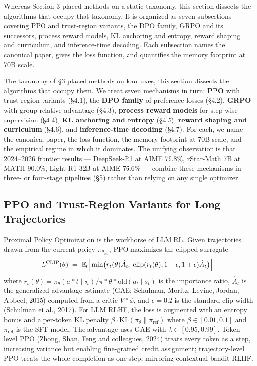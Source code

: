 Whereas Section 3 placed methods on a static taxonomy, this section dissects the algorithms that occupy that taxonomy. It is organized as seven subsections covering PPO and trust-region variants, the DPO family, GRPO and its successors, process reward models, KL anchoring and entropy, reward shaping and curriculum, and inference-time decoding. Each subsection names the canonical paper, gives the loss function, and quantifies the memory footprint at 70B scale.

The taxonomy of §3 placed methods on four axes; this section dissects the algorithms that occupy them. We treat seven mechanisms in turn: \textbf{PPO} with trust-region variants (§4.1), the \textbf{DPO family} of preference losses (§4.2), \textbf{GRPO} with group-relative advantage (§4.3), \textbf{process reward models} for step-wise supervision (§4.4), \textbf{KL anchoring and entropy} (§4.5), \textbf{reward shaping and curriculum} (§4.6), and \textbf{inference-time decoding} (§4.7). For each, we name the canonical paper, the loss function, the memory footprint at 70B scale, and the empirical regime in which it dominates. The unifying observation is that 2024--2026 frontier results --- DeepSeek-R1 at AIME 79.8\%, rStar-Math 7B at MATH 90.0\%, Light-R1 32B at AIME 76.6\% --- combine these mechanisms in three- or four-stage pipelines (§5) rather than relying on any single optimizer.

\subsection{PPO and Trust-Region Variants for Long Trajectories}\label{ppo-and-trust-region-variants-for-long-trajectories}

Proximal Policy Optimization is the workhorse of LLM RL. Given trajectories drawn from the current policy \(\pi_{\theta_{\mathrm{old}}}\), PPO maximizes the clipped surrogate
\[L^{\mathrm{CLIP}}(\theta) \;=\; \mathbb{E}_t\Bigl[ \min\bigl(r_t(\theta) \hat A_t,\; \mathrm{clip}(r_t(\theta), 1-\epsilon, 1+\epsilon) \hat A_t\bigr) \Bigr],\]
where \(r_t(\theta) = \pi_\theta(a*t\mid s_t)/\pi*{\theta*{\mathrm{old}}}(a_t\mid s_t)\) is the importance ratio, \(\hat A_t\) is the generalized advantage estimate (GAE; Schulman, Moritz, Levine, Jordan, Abbeel, 2015) computed from a critic \(V*\phi\), and \(\epsilon = 0.2\) is the standard clip width (Schulman et al., 2017). For LLM RLHF, the loss is augmented with an entropy bonus and a per-token KL penalty \(\beta \cdot \mathrm{KL}(\pi_\theta \| \pi_{\mathrm{ref}})\) where \(\beta \in [0.01, 0.1]\) and \(\pi_{\mathrm{ref}}\) is the SFT model. The advantage uses GAE with \(\lambda \in [0.95, 0.99]\). Token-level PPO (Zhong, Shan, Feng and colleagues, 2024) treats every token as a step, increasing variance but enabling fine-grained credit assignment; trajectory-level PPO treats the whole completion as one step, mirroring contextual-bandit RLHF.


